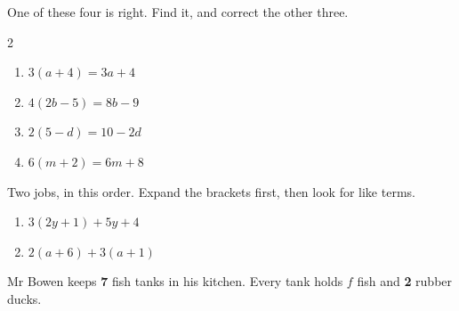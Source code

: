 \documentclass[12pt,a4paper]{article}
\begin{document}

\noindent One of these four is right. Find it, and correct the other three.

\vspace{4pt}
\begin{multicols}{2}
\begin{enumerate}[label=(\alph*), itemsep=10pt]
  \item $3(a + 4) = 3a + 4$ \; \blank[2.2cm]
  \item $4(2b - 5) = 8b - 9$ \; \blank[2.2cm]
  \item $2(5 - d) = 10 - 2d$ \; \blank[2.2cm]
  \item $6(m + 2) = 6m + 8$ \; \blank[2.2cm]
\end{enumerate}
\end{multicols}


\noindent Two jobs, in this order. Expand the brackets first, then look for like terms.

\vspace{2pt}
\begin{enumerate}[label=(\alph*), itemsep=4pt]
  \item $3(2y + 1) + 5y + 4$
        \begin{workspace}[1.7cm]\end{workspace}
  \item $2(a + 6) + 3(a + 1)$
        \begin{workspace}[1.7cm]\end{workspace}
\end{enumerate}


\noindent Mr Bowen keeps \textbf{7} fish tanks in his kitchen. Every tank holds $f$
fish and \textbf{2} rubber ducks.
\end{document}
